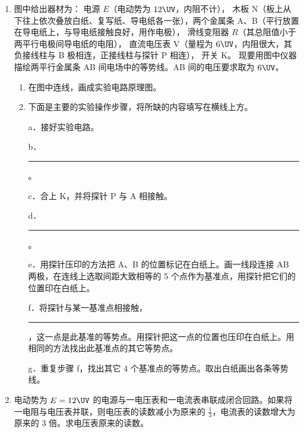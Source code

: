 \documentclass[\gkver]{gaokaozhenti}
\begin{document}
\begin{enumerate}
\item
图中给出器材为：
电源 $E$（电动势为 $12\UV$，内阻不计），
木板 N（板上从下往上依次叠放白纸、复写纸、导电纸各一张），两个金属条 A、B（平行放置在导电纸上，与导电纸接触良好，用作电极），
滑线变阻器 $R$（其总阻值小于两平行电极间导电纸的电阻），
直流电压表 V（量程为 $6\UV$，内阻很大，其负接线柱与 B 极相连，正接线柱与探针 P 相连），
开关 K。
现要用图中仪器描绘两平行金属条 AB 间电场中的等势线。AB 间的电压要求取为 $6\UV$。
\begin{enumerate}
\item
在图中连线，画成实验电路原理图。
\item
下面是主要的实验操作步骤，将所缺的内容填写在横线上方。

a．接好实验电路。

b．\rule{4.0cm}{0.4pt}。

c．合上 K，并将探针 P 与 A 相接触。

d．\rule{4.0cm}{0.4pt}。

e．用探针压印的方法把 A、B 的位置标记在白纸上。画一线段连接 AB 两极，在连线上选取间距大致相等的 5 个点作为基准点，用探针把它们的位置印在白纸上。

f．将探针与某一基准点相接触，\rule{3.0cm}{0.4pt}，这一点是此基准的等势点。用探针把这一点的位置也压印在白纸上。用相同的方法找出此基准点的其它等势点。

g．重复步骤 f，找出其它 4 个基准点的等势点。取出白纸画出各条等势线。
\end{enumerate}

\item
电动势为 $E=12\UV$ 的电源与一电压表和一电流表串联成闭合回路。如果将一电阻与电压表并联，则电压表的读数减小为原来的 $\frac{1}{3}$，电流表的读数增大为原来的 3 倍。求电压表原来的读数。


\end{enumerate}
\end{document}
